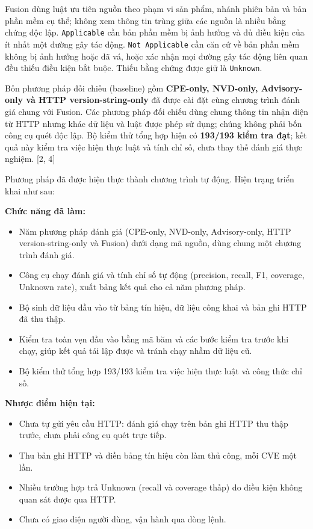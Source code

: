 \documentclass[12pt,a4paper]{article}
\providecommand{\tightlist}{\setlength{\itemsep}{0pt}\setlength{\parskip}{0pt}}
\begin{document}
Fusion dùng luật ưu tiên nguồn theo phạm vi sản phẩm, nhánh phiên bản và bản phần mềm cụ thể; không xem thông tin trùng giữa các nguồn là nhiều bằng chứng độc lập. \texttt{Applicable} cần bản phần mềm bị ảnh hưởng và đủ điều kiện của ít nhất một đường gây tác động. \texttt{Not\ Applicable} cần căn cứ về bản phần mềm không bị ảnh hưởng hoặc đã vá, hoặc xác nhận mọi đường gây tác động liên quan đều thiếu điều kiện bắt buộc. Thiếu bằng chứng được giữ là \texttt{Unknown}.

Bốn phương pháp đối chiếu (baseline) gồm \textbf{CPE-only, NVD-only, Advisory-only và HTTP version-string-only} đã được cài đặt cùng chương trình đánh giá chung với Fusion. Các phương pháp đối chiếu dùng chung thông tin nhận diện từ HTTP nhưng khác dữ liệu và luật được phép sử dụng; chúng không phải bốn công cụ quét độc lập. Bộ kiểm thử tổng hợp hiện có \textbf{193/193 kiểm tra đạt}; kết quả này kiểm tra việc hiện thực luật và tính chỉ số, chưa thay thế đánh giá thực nghiệm. {[}2, 4{]}

Phương pháp đã được hiện thực thành chương trình tự động. Hiện trạng triển khai như sau:

\textbf{Chức năng đã làm:}
\begin{itemize}
\tightlist
\item
  Năm phương pháp đánh giá (CPE-only, NVD-only, Advisory-only, HTTP version-string-only và Fusion) dưới dạng mã nguồn, dùng chung một chương trình đánh giá.
\item
  Công cụ chạy đánh giá và tính chỉ số tự động (precision, recall, F1, coverage, Unknown rate), xuất bảng kết quả cho cả năm phương pháp.
\item
  Bộ sinh dữ liệu đầu vào từ bảng tín hiệu, dữ liệu công khai và bản ghi HTTP đã thu thập.
\item
  Kiểm tra toàn vẹn đầu vào bằng mã băm và các bước kiểm tra trước khi chạy, giúp kết quả tái lập được và tránh chạy nhầm dữ liệu cũ.
\item
  Bộ kiểm thử tổng hợp 193/193 kiểm tra việc hiện thực luật và công thức chỉ số.
\end{itemize}

\textbf{Nhược điểm hiện tại:}
\begin{itemize}
\tightlist
\item
  Chưa tự gửi yêu cầu HTTP: đánh giá chạy trên bản ghi HTTP thu thập trước, chưa phải công cụ quét trực tiếp.
\item
  Thu bản ghi HTTP và điền bảng tín hiệu còn làm thủ công, mỗi CVE một lần.
\item
  Nhiều trường hợp trả Unknown (recall và coverage thấp) do điều kiện không quan sát được qua HTTP.
\item
  Chưa có giao diện người dùng, vận hành qua dòng lệnh.
\end{itemize}
\end{document}
